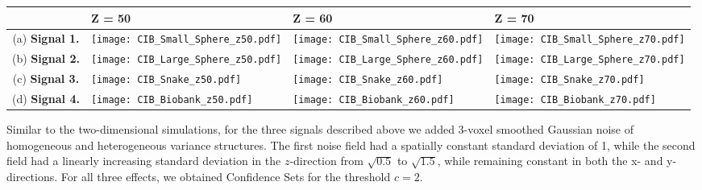\begin{table}[htbp]
\hspace*{-0.5cm}
\begin{adjustbox}{center}
\centering
    \begin{tabular}{cm{50mm}m{50mm}m{50mm}}
       \toprule
         & \hspace{15.5mm} Z = 50 & \hspace{15.5mm} Z = 60 & \hspace{15.5mm} Z = 70 \\
        \midrule
        (a) \textbf{Signal 1.} & \texttt{[image: CIB\_Small\_Sphere\_z50.pdf]} & \texttt{[image: CIB\_Small\_Sphere\_z60.pdf]} & \texttt{[image: CIB\_Small\_Sphere\_z70.pdf]} \\
        (b) \textbf{Signal 2.} & \texttt{[image: CIB\_Large\_Sphere\_z50.pdf]} & \texttt{[image: CIB\_Large\_Sphere\_z60.pdf]} & \texttt{[image: CIB\_Large\_Sphere\_z70.pdf]} \\
        (c) \textbf{Signal 3.} & \texttt{[image: CIB\_Snake\_z50.pdf]} & \texttt{[image: CIB\_Snake\_z60.pdf]} & \texttt{[image: CIB\_Snake\_z70.pdf]} \\
        (d) \textbf{Signal 4.} & \texttt{[image: CIB\_Biobank\_z50.pdf]} & \texttt{[image: CIB\_Biobank\_z60.pdf]} & \texttt{[image: CIB\_Biobank\_z70.pdf]} \\
        \bottomrule
    \end{tabular}
\end{adjustbox}
    \label{tbl:3D_figures}
\end{table}

Similar to the two-dimensional simulations, for the three signals described above we added 3-voxel smoothed Gaussian noise of homogeneous and heterogeneous variance structures. The first noise field had a spatially constant standard deviation of 1, while the second field had a linearly increasing standard deviation in the $z$-direction from $\sqrt{0.5}$ to $\sqrt{1.5}$, while remaining constant in both the x- and y- directions. For all three effects, we obtained Confidence Sets for the threshold $c = 2$. 

